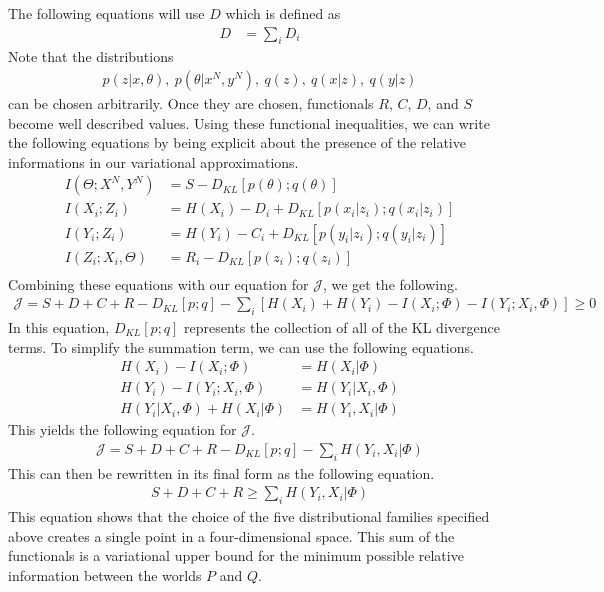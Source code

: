 \documentclass[book.tex]{subfiles}
\begin{document}
The following equations will use $D$ which is defined as 
\begin{align} 
D & =\sum_i D_i
\end{align}
Note that the distributions 
\begin{align} p(z|x,\theta),\ p(\theta|x^N,y^N),\ q(z),\ q(x|z),\ q(y|z)\end{align}
can be chosen arbitrarily. Once they are chosen, functionals $R$, $C$, $D$, and $S$ become well described values. Using these functional inequalities, we can write the following equations by being explicit about the presence of the relative informations in our variational approximations.
\begin{align}
I(\Theta;X^N,Y^N)&=S-D_{KL}[p(\theta);q(\theta)]\\ 
I(X_i;Z_i)&=H(X_i)-D_i+D_{KL}[p(x_i|z_i);q(x_i|z_i)]\\
I(Y_i;Z_i)&=H(Y_i)-C_i+D_{KL}[p(y_i|z_i);q(y_i|z_i)]\\
I(Z_i;X_i,\Theta)&=R_i-D_{KL}[p(z_i);q(z_i)]\\
\end{align}
Combining these equations with our equation for $\mathcal{J}$, we get the following.
\begin{align}
\mathcal{J}=S+D+C+R-D_{KL}[p;q]-\sum_i[H(X_i)+H(Y_i)-I(X_i;\Phi)-I(Y_i;X_i,\Phi)] \geq 0
\end{align}
In this equation, $D_{KL}[p;q]$ represents the collection of all of the KL divergence terms. To simplify the summation term, we can use the following equations.
\begin{align}
H(X_i)-I(X_i;\Phi)&=H(X_i|\Phi)\\
H(Y_i)-I(Y_i;X_i,\Phi)&=H(Y_i|X_i,\Phi)\\
H(Y_i|X_i,\Phi)+H(X_i|\Phi)&=H(Y_i,X_i|\Phi)
\end{align}
This yields the following equation for $\mathcal{J}$.
\begin{align}
\mathcal{J}=S+D+C+R-D_{KL} [p;q] - \sum_i H(Y_i,X_i|\Phi)
\end{align}
This can then be rewritten in its final form as the following equation.
\begin{align}
S+D+C+R \geq \sum_i H(Y_i,X_i|\Phi)
\end{align}
This equation shows that the choice of the five distributional families specified above creates a single point in a four-dimensional space. This sum of the functionals is a variational upper bound for the minimum possible relative information between the worlds $P$ and $Q$. 
\end{document}
